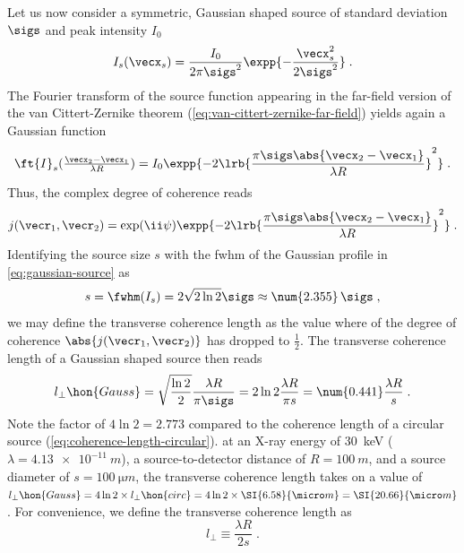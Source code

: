 \documentclass[
twoside,
openright,
titlepage,
numbers=noenddot,
headinclude,
fleqn,
a4paper,
footinclude=true,
cleardoublepage=empty,
abstractoff,
BCOR=5mm,
paper=a4,
fontsize=11pt,
british,ngerman,american,
]{scrreprt}
\begin{document}
Let us now consider a symmetric, Gaussian shaped source of standard
deviation $\sigs$ and peak intensity $I_0$
\begin{equation}
  \label{eq:gaussian-source}
  I_s(\vecx_s) = 
  \frac{I_0}{2\pi\sigs^2} \expp{-\frac{\vecx_s^2}{2\sigs^2}} \;.
\end{equation}
The Fourier transform of the source function appearing in the
far-field version of the van Cittert-Zernike theorem
(\cref{eq:van-cittert-zernike-far-field}) yields again a Gaussian
function
\begin{equation}
  \label{eq:gaussian-source-ft}
  \ft{I}_s(\tfrac{\vecx_2-\vecx_1}{\lambda R})
  = I_0  \expp{-2 \lrb{ \frac{\pi\sigs\abs{\vecx_2-\vecx_1}}{\lambda R} }^2 }  \;.
\end{equation}
Thus, the complex degree of coherence reads
\begin{equation}
  \label{eq:gaussian-source-j}
  j(\vecr_1,\vecr_2) = \exp(\ii \psi)
  \expp{ -2 \lrb{ 
      \frac{ \pi\sigs\abs{\vecx_2-\vecx_1} }{ \lambda R } }^2 } \;.
\end{equation}
Identifying the source size $s$ with the \ac{fwhm} of the Gaussian
profile in \cref{eq:gaussian-source} as
\begin{equation}
  \label{eq:fwhm-source}
  s = \fwhm(I_s) = 2\sqrt{2\ln{2}}\sigs\approx\num{2.355}\,\sigs \;,
\end{equation}
we may define the transverse coherence length as the value where of
the degree of coherence $\abs{j(\vecr_1,\vecr_2)}$ has dropped to
$\frac12$.  The transverse coherence length of a Gaussian shaped
source then reads
\begin{equation}
  \label{eq:coherence-length-gaussian}
  l_\perp\hon{Gauss}
  = \sqrt{\frac{\ln{2}}{2}}\frac{\lambda R}{\pi \sigs} 
  = 2\ln{2}\frac{\lambda R}{\pi s}
  = \num{0.441}\frac{\lambda R}{s} \;.
\end{equation}
Note the factor of $4\ln{2}=\num{2.773}$ compared to the coherence
length of a circular source (\cref{eq:coherence-length-circular}).
\Eg{} at an X-ray energy of \SI{30}{keV} ($\lambda=\SI{4.13e-11}{m}$),
a source-to-detector distance of $R=\SI{100}{m}$, and a source
diameter of $s=\SI{100}{\micro m}$, the transverse coherence length
takes on a value of $l_\perp\hon{Gauss}= 4 \ln{2}\times
l_\perp\hon{circ} = 4\ln{2}\times\SI{6.58}{\micro m} =
\SI{20.66}{\micro m}$.  For convenience, we define the transverse
coherence length as
\begin{equation}
  \label{eq:coherence-length}
  l_\perp \equiv \frac{\lambda R}{2 s} \;.
\end{equation}
\end{document}
